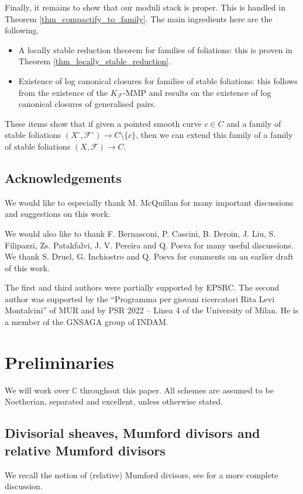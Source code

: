 \documentclass[12pt, a4paper]{amsart}
\newcounter{Theorem}
\theoremstyle{definition}
\theoremstyle{named}
\begin{document}
Finally, it remains to show that our moduli stack is proper.  This is handled in Theorem \ref{thm_compactify_to_family}.  The main ingredients here are the following.
\begin{itemize}
    \item A locally stable reduction theorem for families of foliations: this is proven in Theorem \ref{thm_locally_stable_reduction}.

    \item Existence of log canonical closures for families of stable foliations:  this follows from the existence of the $K_{\mathcal F}$-MMP and results on the existence of log canonical closures of generalised pairs.
\end{itemize}
These items show that if given a pointed smooth curve $c \in C$ and a family of stable foliations $(X^\circ, \mathcal F^\circ) \to C \setminus \{c\}$, then we can extend this family of a family of stable foliations $(X, \mathcal F) \to C$.  


\subsection*{Acknowledgements}

We would like to especially thank M. McQuillan for many important discussions and suggestions on this work.

We would also like to thank F. Bernasconi, P. Cascini, B. Deroin, J. Liu, S. Filipazzi, Zs. Patakfalvi, J. V. Pereira and Q. Posva for many useful discussions. We thank S. Druel, G. Inchiostro and Q. Posva for comments on an earlier draft of this work. 

The first and third authors were partially supported by EPSRC.
The second author was supported by the “Programma per giovani ricercatori Rita Levi Montalcini” of MUR and by PSR 2022 – Linea 4 of the University of Milan. 
He is a member of the GNSAGA group of INDAM.

\section{Preliminaries}

We will work over $\mathbb C$ throughout this paper.  All schemes are assumed to be Noetherian, separated and excellent, unless otherwise stated.

\subsection{Divisorial sheaves, Mumford divisors and relative Mumford divisors} \label{Prelim. sheaves}
We recall the notion of (relative) Mumford divisors, 
see \cite[\S 4.8]{modbook} for a more complete discussion.
\end{document}
